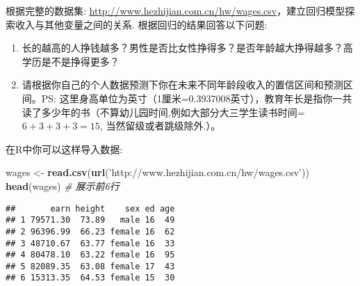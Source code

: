 \documentclass[]{article}
\newenvironment{Shaded}{\begin{snugshade}}{\end{snugshade}}
\newcommand{\CommentTok}[1]{\textcolor[rgb]{0.56,0.35,0.01}{\textit{#1}}}
\newcommand{\KeywordTok}[1]{\textcolor[rgb]{0.13,0.29,0.53}{\textbf{#1}}}
\newcommand{\NormalTok}[1]{#1}
\newcommand{\StringTok}[1]{\textcolor[rgb]{0.31,0.60,0.02}{#1}}
\providecommand{\tightlist}{%
  \setlength{\itemsep}{0pt}\setlength{\parskip}{0pt}}
\begin{document}
根据完整的数据集:
\url{http://www.hezhijian.com.cn/hw/wages.csv}，建立回归模型探索收入与其他变量之间的关系.
根据回归的结果回答以下问题:

\begin{enumerate}
\def\labelenumi{\arabic{enumi}.}
\tightlist
\item
  长的越高的人挣钱越多？男性是否比女性挣得多？是否年龄越大挣得越多？高学历是不是挣得更多？
\item
  请根据你自己的个人数据预测下你在未来不同年龄段收入的置信区间和预测区间。PS:
  这里身高单位为英寸（1厘米=0.3937008英寸），教育年长是指你一共读了多少年的书（不算幼儿园时间,例如大部分大三学生读书时间=\(6+3+3+3=15\),
  当然留级或者跳级除外.）。
\end{enumerate}

在R中你可以这样导入数据:

\begin{Shaded}
\begin{Highlighting}[]
\NormalTok{wages <-}\StringTok{ }\KeywordTok{read.csv}\NormalTok{(}\KeywordTok{url}\NormalTok{(}\StringTok{'http://www.hezhijian.com.cn/hw/wages.csv'}\NormalTok{))}
\KeywordTok{head}\NormalTok{(wages) }\CommentTok{# 展示前6行}
\end{Highlighting}
\end{Shaded}

\begin{verbatim}
##       earn height    sex ed age
## 1 79571.30  73.89   male 16  49
## 2 96396.99  66.23 female 16  62
## 3 48710.67  63.77 female 16  33
## 4 80478.10  63.22 female 16  95
## 5 82089.35  63.08 female 17  43
## 6 15313.35  64.53 female 15  30
\end{verbatim}
\end{document}
